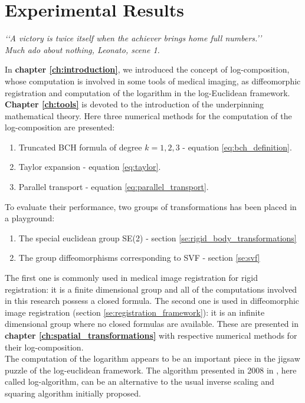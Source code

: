\chapter{Experimental Results}\label{ch:results}

\begin{flushright}
	\emph{\lq\lq A victory is twice itself when the achiever brings home full numbers.\rq\rq \\
		       \emph{Much ado about nothing}, Leonato, scene 1.}
\end{flushright}

\vspace{0.6cm}

In {\bf chapter \ref{ch:introduction}}, we introduced the concept of log-composition, whose computation is involved in some tools of medical imaging, as diffeomorphic registration and computation of the logarithm in the log-Euclidean framework. 
{\bf Chapter \ref{ch:tools}} is devoted to the introduction of the underpinning mathematical theory. Here three numerical methods for the computation of the log-composition are presented:
\begin{enumerate}
	\item Truncated BCH formula of degree $k=1,2,3$ - equation \ref{eq:bch_definition}.
	\item Taylor expansion - equation \ref{eq:taylor}.
	\item Parallel transport - equation \ref{eq:parallel_transport}.
\end{enumerate}
To evaluate their performance, two groups of transformations has been placed in a playground:
\begin{enumerate}
	\item The special euclidean group SE(2) - section \ref{se:rigid_body_transformations}
	\item The group diffeomorphisms corresponding to SVF - section \ref{se:svf}
\end{enumerate}
The first one is commonly used in medical image registration for rigid registration: it is a finite dimensional group and all of the computations involved in this research possess a closed formula. The second one is used in diffeomorphic image registration (section \ref{se:registration_framework}): it is an infinite dimensional group where no closed formulas are available. 
These are presented in {\bf chapter \ref{ch:spatial_transformations}} with respective numerical methods for their log-composition.\\
The computation of the logarithm appears to be an important piece in the jigsaw puzzle of the log-euclidean framework. The algorithm presented in 2008 in \cite{Bossa:08}, here called log-algorithm, can be an alternative to the usual inverse scaling and squaring algorithm initially proposed.  
